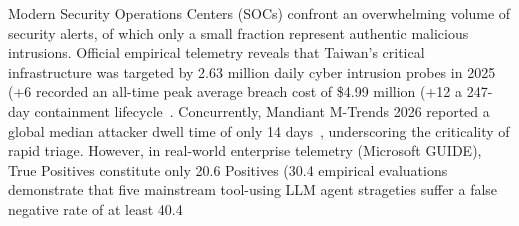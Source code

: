 Modern Security Operations Centers (SOCs) confront an overwhelming volume
of security alerts, of which only a small fraction represent authentic malicious
intrusions. Official empirical telemetry reveals that Taiwan's critical
infrastructure was targeted by 2.63 million daily cyber intrusion probes in 2025
(+6%
recorded an all-time peak average breach cost of \$4.99 million (+12%
a 247-day containment lifecycle~\cite{ibm2026databreach}. Concurrently, Mandiant
M-Trends 2026 reported a global median attacker dwell time of only 14
days~\cite{mandiant2026mtrends}, underscoring the criticality of rapid triage.
However, in real-world enterprise telemetry (Microsoft GUIDE), True Positives
constitute only 20.6%
Positives (30.4%
empirical evaluations demonstrate that five mainstream tool-using LLM agent
strageties suffer a false negative rate of at least 40.4
